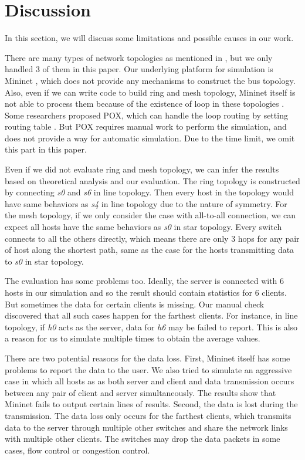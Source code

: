 \section{Discussion} \label{sec:discussion}

In this section, we will discuss some limitations and possible causes in our work.

There are many types of network topologies as mentioned in \cite{NetworkTopo:wiki},
but we only handled 3 of them in this paper. Our underlying platform for simulation
is Mininet \cite{Mininet:official}, which does not provide any mechanisms to construct
the bus topology. Also, even if we can write code to build ring and mesh topology,
Mininet itself is not able to process them because of the existence of loop in these
topologies \cite{MininetFAQ:web}. Some researchers proposed POX, which can handle the
loop routing by setting routing table \cite{POX:web}. But POX requires manual work 
to perform the simulation, and does not provide a way for automatic simulation. 
Due to the time limit, we omit this part in this paper.

Even if we did not evaluate ring and mesh topology, we can infer the results based on 
theoretical analysis and our evaluation. The ring topology is constructed by connecting
{\it s0} and {\it s6} in line topology. Then every host in the topology would have same 
behaviors as {\it s4} in line topology due to the nature of symmetry. 
For the mesh topology, if we only consider the case with all-to-all connection, we can
expect all hosts have the same behaviors as {\it s0} in star topology. Every switch 
connects to all the others directly, which means there are only 3 hops for any pair
of host along the shortest path, same as the case for the hosts transmitting data to 
{\it s0} in star topology. 

The evaluation has some problems too. Ideally, the server is connected with 6 hosts in
our simulation and so the result should contain statistics for 6 clients. But sometimes
the data for certain clients is missing. Our manual check discovered that all such cases 
happen for the farthest clients. For instance, in line topology, if {\it h0} acts as the 
server, data for {\it h6} may be failed to report. This is also a reason for us to 
simulate multiple times to obtain the average values. 

There are two potential reasons for the data loss. First, Mininet itself has some problems 
to report the data to the user. We also tried to simulate an aggressive case in which all 
hosts as as both server and client and data transmission occurs between any pair of 
client and server simultaneously. The results show that Mininet fails to output certain lines
of results. Second, the data is lost during the transmission. The data loss only occurs for 
the farthest clients, which transmits data to the server through multiple other switches and 
share the network links with multiple other clients. 
The switches may drop the data packets in some cases, \eg flow control or congestion control.
